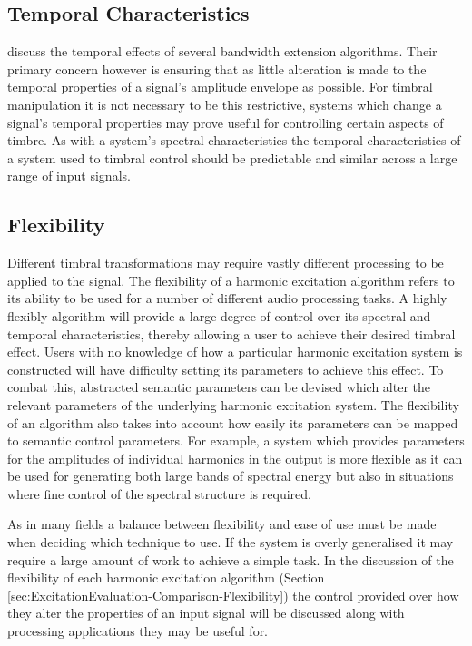 	\subsection{Temporal Characteristics}
	\label{sec:ExcitationEvaluation-Evaluation-TemporalCharacteristics}		
		\citet{larsen2004audio} discuss the temporal effects of several bandwidth extension algorithms. Their
		primary concern however is ensuring that as little alteration is made to the temporal properties of a
		signal's amplitude envelope as possible. For timbral manipulation it is not necessary to be this
		restrictive, systems which change a signal's temporal properties may prove useful for controlling certain
		aspects of timbre. As with a system's spectral characteristics the temporal characteristics of a system
		used to timbral control should be predictable and similar across a large range of input signals.

	\subsection{Flexibility}
	\label{sec:ExcitationEvaluation-Evaluation-Flexibility}
		Different timbral transformations may require vastly different processing to be applied to the signal. The
		flexibility of a harmonic excitation algorithm refers to its ability to be used for a number of different
		audio processing tasks. A highly flexibly algorithm will provide a large degree of control over its
		spectral and temporal characteristics, thereby allowing a user to achieve their desired timbral effect.
		Users with no knowledge of how a particular harmonic excitation system is constructed will have difficulty
		setting its parameters to achieve this effect. To combat this, abstracted semantic parameters can be
		devised which alter the relevant parameters of the underlying harmonic excitation system. The flexibility
		of an algorithm also takes into account how easily its parameters can be mapped to semantic control
		parameters. For example, a system which provides parameters for the amplitudes of individual harmonics in
		the output is more flexible as it can be used for generating both large bands of spectral energy but also
		in situations where fine control of the spectral structure is required. 

		As in many fields a balance between flexibility and ease of use must be made when deciding which technique
		to use. If the system is overly generalised it may require a large amount of work to achieve a simple task.
		In the discussion of the flexibility of each harmonic excitation algorithm (Section
		\ref{sec:ExcitationEvaluation-Comparison-Flexibility}) the control provided over how they alter the
		properties of an input signal will be discussed along with processing applications they may be useful for.

